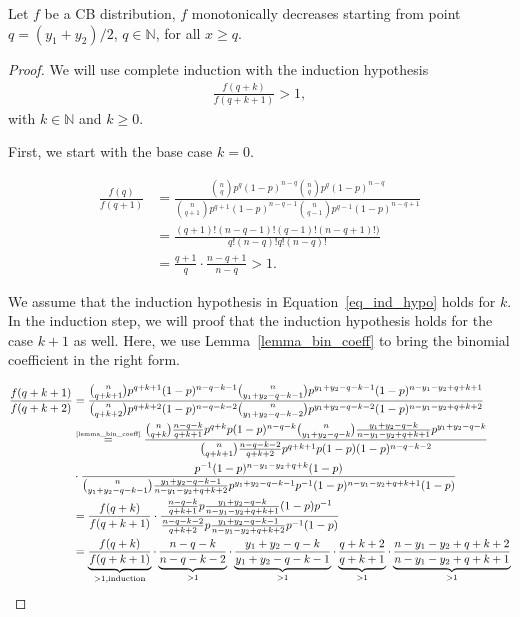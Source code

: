 \begin{mylemma}
 Let $f$ be a CB distribution, $f$ monotonically decreases starting from point $q = (y_1 + y_2)/2$, $q \in \mathbb{N}$, for all $x \geq q$.
\label{lemma_cb_mono}
\end{mylemma}
\begin{proof}
 We will use complete induction with the induction hypothesis
 \begin{align}
  \frac{f(q+k)}{f(q+k+1)} > 1, \label{eq_ind_hypo}
 \end{align}
 with $k \in \mathbb{N}$ and $k \geq 0$.
 
 \noindent
 First, we start with the base case $k=0$.
 
 \begin{align*}
  \frac{f(q)}{f(q+1)} &= \frac{{n \choose q}p^q(1-p)^{n-q} {n \choose q} p^q (1-p)^{n-q}}{{n \choose q+1} p^{q+1} (1-p)^{n-q-1} {n \choose q-1} p^{q-1} (1-p)^{n-q+1}} \\
  &= \frac{(q+1)!(n-q-1)!(q-1)! (n-q+1)!)}{q! (n-q)! q!(n-q)!} \\
  &= \frac{q+1}{q} \cdot \frac{n-q+1}{n-q} > 1.
 \end{align*}

 \noindent
 We assume that the induction hypothesis in Equation~\ref{eq_ind_hypo} holds for $k$.
 In the induction step, we will proof that the induction hypothesis holds for the case $k+1$ as well.
 Here, we use Lemma~\ref{lemma_bin_coeff} to bring the binomial coefficient in the right form.
 
 \begin{align*}
  \frac{f(q+k+1)}{f(q+k+2)} &= \frac{{n \choose q+k+1} p^{q+k+1} (1-p)^{n-q-k-1} {n \choose y_1 + y_2 -q-k-1} p^{y_1+y_2-q-k-1} (1-p)^{n-y_1-y_2+q+k+1}}{{n \choose q+k+2} p^{q+k+2} (1-p)^{n-q-k-2} {n \choose y_1 + y_2 -q-k-2} p^{y_1+y_2-q-k-2} (1-p)^{n-y_1-y_2+q+k+2}} \\
  &\overset{\tiny \ref{lemma_bin_coeff}}{=} \frac{{n \choose q+k} \frac{n-q-k}{q+k+1}p^{q+k}p(1-p)^{n-q-k}{n \choose y_1+y_2-q-k}\frac{y_1+y_2-q-k}{n-y_1-y_2+q+k+1}p^{y_1+y_2-q-k}}{{n \choose q+k+1} \frac{n-q-k-2}{q+k+2}p^{q+k+1}p(1-p)(1-p)^{n-q-k-2}} \\
  &\cdot \frac{p^{-1}(1-p)^{n-y_1-y_2+q+k}(1-p)}{{n \choose y_1+y_2-q-k-1}\frac{y_1+y_2-q-k-1}{n-y_1-y_2+q+k+2}p^{y_1+y_2-q-k-1}p^{-1}(1-p)^{n-y_1-y_2+q+k+1}(1-p)} \\
  &= \frac{f(q+k)}{f(q+k+1)} \cdot \frac{\frac{n-q-k}{q+k+1}p\frac{y_1+y_2-q-k}{n-y_1-y_2+q+k+1} (1-p) p^{-1}}{\frac{n-q-k-2}{q+k+2}p\frac{y_1+y_2-q-k-1}{n-y_1-y_2+q+k+2}p^{-1}(1-p)} \\
  &= \underbrace{\frac{f(q+k)}{f(q+k+1)}}_{> 1, \text{induction}} \cdot \underbrace{\frac{n-q-k}{n-q-k-2}}_{>1} \cdot \underbrace{\frac{y_1+y_2-q-k}{y_1+y_2-q-k-1}}_{>1} \cdot \underbrace{\frac{q+k+2}{q+k+1}}_{>1} \cdot \underbrace{\frac{n-y_1-y_2+q+k+2}{n-y_1-y_2+q+k+1}}_{>1}
 \end{align*}
\end{proof}


